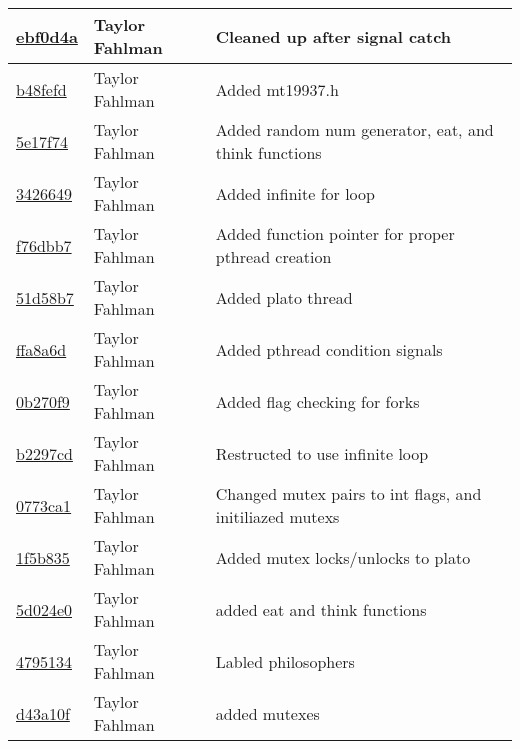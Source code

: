 \begin{tabular}{l l l}
\href{https://github.com/fahlmant/cs444/commit/ebf0d4a0840a6a6bb8b17916dc160c469197593d}{ebf0d4a} & Taylor Fahlman & Cleaned up after signal catch\\\hline
\href{https://github.com/fahlmant/cs444/commit/b48fefd146280d909c6cf2155b3fe1fdec0a3974}{b48fefd} & Taylor Fahlman & Added mt19937.h\\\hline
\href{https://github.com/fahlmant/cs444/commit/5e17f747c9f116ab75a330d8ce0bfdb3f3ec35ab}{5e17f74} & Taylor Fahlman & Added random num generator, eat, and think functions\\\hline
\href{https://github.com/fahlmant/cs444/commit/3426649ae1918162e2ffc19e8b76ffebcbfeafb6}{3426649} & Taylor Fahlman & Added infinite for loop\\\hline
\href{https://github.com/fahlmant/cs444/commit/f76dbb79c66c9c07cf4077e12042e9a2e0fd820f}{f76dbb7} & Taylor Fahlman & Added function pointer for proper pthread creation\\\hline
\href{https://github.com/fahlmant/cs444/commit/51d58b7179ad83063834c6bf5eac684dbe2dcea1}{51d58b7} & Taylor Fahlman & Added plato thread\\\hline
\href{https://github.com/fahlmant/cs444/commit/ffa8a6dcce81ffcaa6b0953ac7e66c13a5eebf23}{ffa8a6d} & Taylor Fahlman & Added pthread condition signals\\\hline
\href{https://github.com/fahlmant/cs444/commit/0b270f9d732ab6a652aaba7f6947f13c0e9cdc46}{0b270f9} & Taylor Fahlman & Added flag checking for forks\\\hline
\href{https://github.com/fahlmant/cs444/commit/b2297cd2ec70c735e39a1cc26d5ff39478f011bf}{b2297cd} & Taylor Fahlman & Restructed to use infinite loop\\\hline
\href{https://github.com/fahlmant/cs444/commit/0773ca18437eb1aff2874e73ff18fe67681602dc}{0773ca1} & Taylor Fahlman & Changed mutex pairs to int flags, and initiliazed mutexs\\\hline
\href{https://github.com/fahlmant/cs444/commit/1f5b835fc8b41d44ee33a2f2e6f5ec916591957a}{1f5b835} & Taylor Fahlman & Added mutex locks/unlocks to plato\\\hline
\href{https://github.com/fahlmant/cs444/commit/5d024e0d8a49d0db3b239929402e049376df57e1}{5d024e0} & Taylor Fahlman & added eat and think functions\\\hline
\href{https://github.com/fahlmant/cs444/commit/4795134ae4187793f395617ba52841d7c9e7f6d1}{4795134} & Taylor Fahlman & Labled philosophers\\\hline
\href{https://github.com/fahlmant/cs444/commit/d43a10f1ac0ff2b53122ca42969b95d5e5b474b9}{d43a10f} & Taylor Fahlman & added mutexes\\\hline

\end{tabular}
